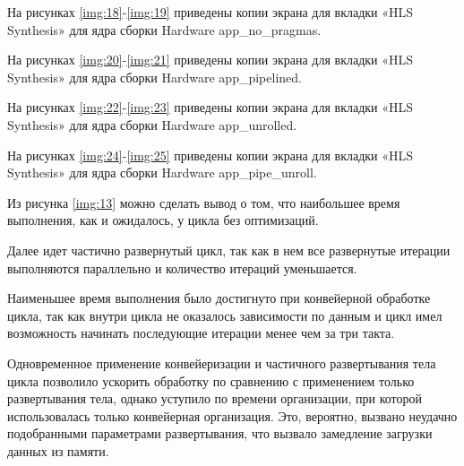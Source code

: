 

\clearpage
На рисунках \ref{img:18}-\ref{img:19} приведены копии экрана для вкладки «HLS Synthesis» для ядра сборки Hardware app\_no\_pragmas.





\clearpage
На рисунках \ref{img:20}-\ref{img:21} приведены копии экрана для вкладки «HLS Synthesis» для ядра сборки Hardware app\_pipelined.




\clearpage
На рисунках \ref{img:22}-\ref{img:23} приведены копии экрана для вкладки «HLS Synthesis» для ядра сборки Hardware app\_unrolled.




\clearpage
На рисунках \ref{img:24}-\ref{img:25} приведены копии экрана для вкладки «HLS Synthesis» для ядра сборки Hardware app\_pipe\_unroll.




Из рисунка \ref{img:13} можно сделать вывод о том, что наибольшее время выполнения, как и ожидалось, у цикла без оптимизаций.

Далее идет частично развернутый цикл, так как в нем все развернутые итерации выполняются параллельно и количество итераций уменьшается.

Наименьшее время выполнения было достигнуто при конвейерной обработке цикла, так как внутри цикла не оказалось зависимости по данным и цикл имел возможность начинать последующие итерации менее чем за три такта.

Одновременное применение конвейеризации и частичного развертывания тела цикла позволило ускорить обработку по сравнению с применением только развертывания тела, однако уступило по времени организации, при которой использовалась только конвейерная организация. Это, вероятно, вызвано неудачно подобранными параметрами развертывания, что вызвало замедление загрузки данных из памяти.



